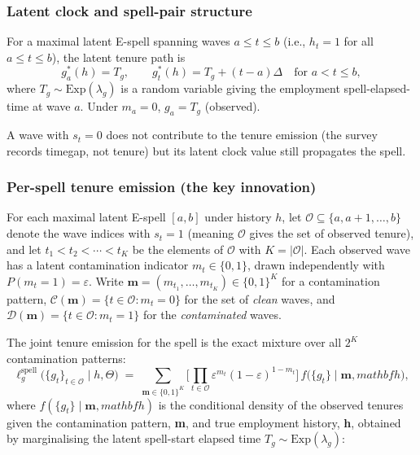 \subsubsection{Latent clock and spell-pair structure}
\label{sec:spell_pair}

For a maximal latent E-spell spanning waves \(a \le t \le b\) (i.e.,
\(h_t = 1\) for all \(a \le t \le b\)), the latent tenure path is
\begin{equation}
g^*_a(h) = T_g, \qquad
g^*_t(h) = T_g + (t-a)\Delta \quad\text{for } a < t \le b,
\label{eq:deterministic_clocks_eps}
\end{equation}
where \(T_g \sim \mathrm{Exp}(\lambda_g)\) is a random variable giving the employment
spell-elapsed-time at wave \(a\). Under \(m_{a} = 0\), \(g_{a} = T_g\)
(observed).

A wave with \(s_{t}=0\) does not
contribute to the tenure emission (the survey records timegap, not tenure)
but its latent clock value still propagates the spell.

\subsubsection{Per-spell tenure emission (the key innovation)}
\label{sec:per_spell}

For each maximal latent E-spell \([a,b]\) under history \(h\), let
\(\mathcal{O} \subseteq \{a,a+1,\dots,b\}\) denote the wave indices with
\(s_{t} = 1\) (meaning \(\mathcal{O}\) gives the set of observed tenure), 
and let \(t_1 < t_2 < \cdots < t_K\) be
the elements of \(\mathcal{O}\) with \(K = |\mathcal{O}|\). Each observed
wave has a latent contamination indicator \(m_t \in \{0,1\}\), drawn
independently with \(P(m_t = 1) = \varepsilon\). Write
\(\mathbf{m} = (m_{t_1}, \dots, m_{t_K}) \in \{0,1\}^K\) for a
contamination pattern, \(\mathcal{C}(\mathbf{m}) = \{t \in \mathcal{O} :
m_t = 0\}\) for the set of \textit{clean} waves, and
\(\mathcal{D}(\mathbf{m}) = \{t \in \mathcal{O} : m_t = 1\}\) for the
\textit{contaminated} waves.

The joint tenure emission for the spell is the exact mixture over all
\(2^K\) contamination patterns:
\begin{equation}
\ell^{\mathrm{spell}}_g\!\big(\{g_t\}_{t \in \mathcal{O}} \mid h, \Theta\big)
\;=\;
\sum_{\mathbf{m} \in \{0,1\}^K}
\biggl[\prod_{t \in \mathcal{O}} \varepsilon^{m_t}(1-\varepsilon)^{1-m_t}\biggr]\,
f\!\big(\{g_t\} \mid \mathbf{m}, mathbf{h}\big),
\label{eq:spell_emission}
\end{equation}
where \(f(\{g_t\} \mid \mathbf{m}, mathbf{h})\) is the conditional density of the
observed tenures given the contamination pattern, \textbf{m}, and true employment history, 
\textbf{h}, obtained by
marginalising the latent spell-start elapsed time
\(T_g \sim \mathrm{Exp}(\lambda_g)\):

